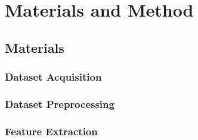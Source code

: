 \chapter{Materials and Method}
\label{ch:method}


\section{Materials}
\label{sec:materials}

\subsection{Dataset Acquisition}
\label{sec:dataset-acquisition}

\subsection{Dataset Preprocessing}
\label{sec:preprocessing}

\subsection{Feature Extraction}
\label{sec:feature-extraction}

